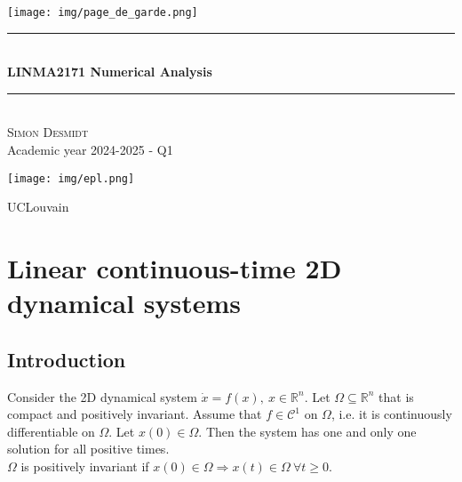 \documentclass[12pt, openany]{report}
\theoremstyle{definition}
\newcommand{\HRule}{\rule{\linewidth}{0.5mm}}
\begin{document}
\begin{titlepage}
    \begin{sffamily}
    \begin{center}
        \texttt{[image: img/page\_de\_garde.png]} \\[1cm]
        \HRule \\[0.4cm]
        { \huge \bfseries LINMA2171 Numerical Analysis \\[0.4cm] }
    
        \HRule \\[1.5cm]
        \textsc{\LARGE Simon Desmidt}\\[1cm]
        \vfill
        \vspace{2cm}
        {\large Academic year 2024-2025 - Q1}
        \vspace{0.4cm}
         
        \texttt{[image: img/epl.png]}
        
        UCLouvain\\
    
    \end{center}
    \end{sffamily}
\end{titlepage}

\setcounter{tocdepth}{1}
\tableofcontents
\chapter{Linear continuous-time 2D dynamical systems}
\section{Introduction}
Consider the 2D dynamical system \(\dot x=f(x),\: x\in \mathbb{R}^n\). Let \(\Omega \subseteq \mathbb{R}^n\) that is compact and positively invariant. Assume that \(f\in \mathcal{C}^1\) on \(\Omega\), i.e. it is continuously differentiable on \(\Omega\). Let \(x(0)\in \Omega\). Then the system has one and only one solution for all positive times. \\

\(\Omega\) is positively invariant if \(x(0)\in \Omega\Longrightarrow x(t)\in \Omega \: \forall t\ge 0\). 
\end{document}

